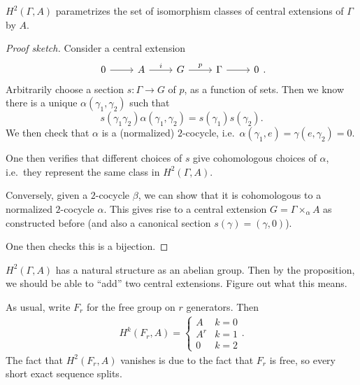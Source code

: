 \documentclass[a4paper]{article}
\newcommand\Free{F}
\begin{document}
\begin{prop}
  $H^2(\Gamma, A)$ parametrizes the set of isomorphism classes of central extensions of $\Gamma$ by $A$.
\end{prop}

\begin{proof}[Proof sketch]
  Consider a central extension
  \[
    \begin{tikzcd}
      0 \ar[r] & A \ar[r, "i"] & G \ar[r, "p"] & \Gamma \ar[r] & 0
    \end{tikzcd}.
  \]
  Arbitrarily choose a section $s\colon \Gamma \to G$ of $p$, as a function of sets. Then we know there is a unique $\alpha(\gamma_1, \gamma_2)$ such that
  \[
    s(\gamma_1 \gamma_2) \alpha(\gamma_1, \gamma_2) = s(\gamma_1) s(\gamma_2).
  \]
  We then check that $\alpha$ is a (normalized) $2$-cocycle, i.e.\ $\alpha(\gamma_1, e) = \gamma(e, \gamma_2) = 0$.

  One then verifies that different choices of $s$ give cohomologous choices of $\alpha$, i.e.\ they represent the same class in $H^2(\Gamma, A)$.

  Conversely, given a $2$-cocycle $\beta$, we can show that it is cohomologous to a normalized $2$-cocycle $\alpha$. This gives rise to a central extension $G = \Gamma \times_\alpha A$ as constructed before (and also a canonical section $s(\gamma) = (\gamma, 0)$).

  One then checks this is a bijection.
\end{proof}

\begin{ex}
  $H^2(\Gamma, A)$ has a natural structure as an abelian group. Then by the proposition, we should be able to ``add'' two central extensions. Figure out what this means.
\end{ex}

\begin{eg}
  As usual, write $\Free_r$ for the free group on $r$ generators. Then
  \begin{align*}
    H^k(\Free_r, A) =
    \begin{cases}
      A & k = 0\\
      A^r & k = 1\\
      0 & k = 2
    \end{cases}.
  \end{align*}
  The fact that $H^2(\Free_r, A)$ vanishes is due to the fact that $\Free_r$ is free, so every short exact sequence splits.
\end{eg}
\end{document}
